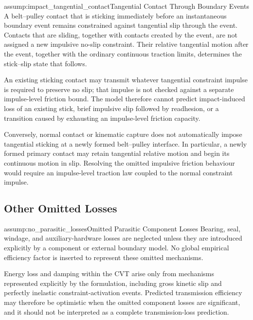 \documentclass[11pt]{report}
\numberwithin{equation}{section}
\newcounter{assump}
\begin{document}
\begin{assumptionblock}{assump:impact_tangential_contact}{Tangential Contact Through Boundary Events}
A belt--pulley contact that is sticking immediately before an instantaneous
boundary event remains constrained against tangential slip through the event.
Contacts that are sliding, together with contacts created by the event, are
not assigned a new impulsive no-slip constraint. Their relative tangential
motion after the event, together with the ordinary continuous traction limits,
determines the stick--slip state that follows.

\AssumptionConsequences
An existing sticking contact may transmit whatever tangential constraint
impulse is required to preserve no slip; that impulse is not checked against a
separate impulse-level friction bound. The model therefore cannot predict
impact-induced loss of an existing stick, brief impulsive slip followed by
readhesion, or a transition caused by exhausting an impulse-level friction
capacity.

Conversely, normal contact or kinematic capture does not automatically impose
tangential sticking at a newly formed belt--pulley interface. In particular, a
newly formed primary contact may retain tangential relative motion and begin
its continuous motion in slip. Resolving the omitted impulsive friction
behaviour would require an impulse-level traction law coupled to the normal
constraint impulse.
\end{assumptionblock}

\subsection{Other Omitted Losses}

\begin{assumptionblock}{assump:no_parasitic_losses}{Omitted Parasitic Component Losses}
Bearing, seal, windage, and auxiliary-hardware losses are neglected unless they
are introduced explicitly by a component or external boundary model. No global
empirical efficiency factor is inserted to represent these omitted mechanisms.

\AssumptionConsequences
Energy loss and damping within the CVT arise only from mechanisms represented
explicitly by the formulation, including gross kinetic slip and perfectly
inelastic constraint-activation events. Predicted transmission
efficiency may therefore be optimistic when the omitted component losses are
significant, and it should not be interpreted as a complete transmission-loss
prediction.
\end{assumptionblock}
\end{document}
